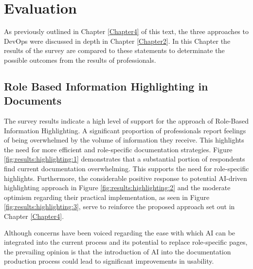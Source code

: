 


\chapter{Evaluation} %

\label{Chapter6} %

As previously outlined in Chapter \ref{Chapter4} of this text, the three approaches to \ac{DevOps} were discussed in depth in Chapter \ref{Chapter2}. In this Chapter the results of the survey are compared to these statements to determinate the possible outcomes from the results of professionals.

\section{Role Based Information Highlighting in Documents}
The survey results indicate a high level of support for the approach of Role-Based Information Highlighting. A significant proportion of professionals report feelings of being overwhelmed by the volume of information they receive. This highlights the need for more efficient and role-specific documentation strategies. Figure \ref{fig:results:highlighting:1} demonstrates that a substantial portion of respondents find current documentation overwhelming. This supports the need for role-specific highlights. Furthermore, the considerable positive response to potential \ac{AI}-driven highlighting approach in Figure \ref{fig:results:highlighting:2} and the moderate optimism regarding their practical implementation, as seen in Figure \ref{fig:results:highlighting:3}, serve to reinforce the proposed approach set out in Chapter \ref{Chapter4}.

Although concerns have been voiced regarding the ease with which \ac{AI} can be integrated into the current process and its potential to replace role-specific pages, the prevailing opinion is that the introduction of \ac{AI} into the documentation production process could lead to significant improvements in usability.

